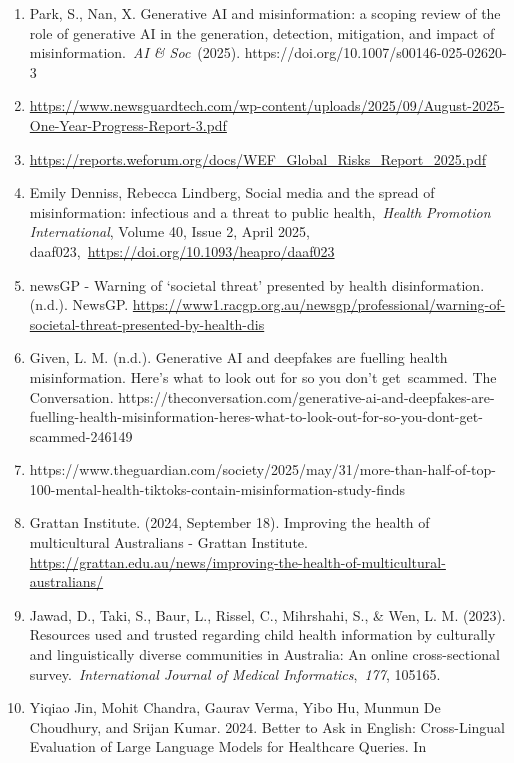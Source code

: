 \documentclass[]{article}
\begin{document}
\begin{enumerate}
\def\labelenumi{\arabic{enumi}.}
\item
  Park, S., Nan, X. Generative AI and misinformation: a scoping review
  of the role of generative AI in the generation, detection, mitigation,
  and impact of misinformation.~\emph{AI \& Soc}~(2025).
  https://doi.org/10.1007/s00146-025-02620-3
\item
  \url{https://www.newsguardtech.com/wp-content/uploads/2025/09/August-2025-One-Year-Progress-Report-3.pdf}
\item
  \url{https://reports.weforum.org/docs/WEF_Global_Risks_Report_2025.pdf}
\item
  Emily Denniss, Rebecca Lindberg, Social media and the spread of
  misinformation: infectious and a threat to public health,~\emph{Health
  Promotion International}, Volume 40, Issue 2, April 2025,
  daaf023,~\url{https://doi.org/10.1093/heapro/daaf023}
\item
  newsGP - Warning of `societal threat' presented by health
  disinformation. (n.d.). NewsGP.
  \url{https://www1.racgp.org.au/newsgp/professional/warning-of-societal-threat-presented-by-health-dis}
\item
  Given, L. M. (n.d.). Generative AI and deepfakes are fuelling health
  misinformation. Here's what to look out for so you don't get~scammed.
  The Conversation.
  https://theconversation.com/generative-ai-and-deepfakes-are-fuelling-health-misinformation-heres-what-to-look-out-for-so-you-dont-get-scammed-246149
\item
  {https://www.theguardian.com/society/2025/may/31/more-than-half-of-top-100-mental-health-tiktoks-contain-misinformation-study-finds}
\item
  Grattan Institute. (2024, September 18). Improving the health of
  multicultural Australians - Grattan Institute.
  \url{https://grattan.edu.au/news/improving-the-health-of-multicultural-australians/}
\item
  Jawad, D., Taki, S., Baur, L., Rissel, C., Mihrshahi, S., \& Wen, L.
  M. (2023). Resources used and trusted regarding child health
  information by culturally and linguistically diverse communities in
  Australia: An online cross-sectional survey.~\emph{International
  Journal of Medical Informatics},~\emph{177}, 105165.
\item
  Yiqiao Jin, Mohit Chandra, Gaurav Verma, Yibo Hu, Munmun De Choudhury,
  and Srijan Kumar. 2024. Better to Ask in English: Cross-Lingual
  Evaluation of Large Language Models for Healthcare Queries. In

\end{enumerate}
\end{document}
